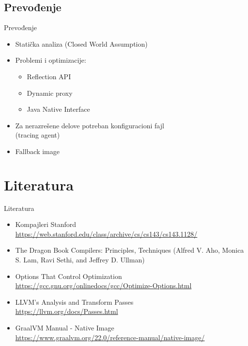 \documentclass[compress, containsverbatim,mathserif, xcolor=dvipsnames, unicode]{beamer}
\begin{document}
\subsection{Prevođenje}
\begin{frame}{Prevođenje}
    \begin{itemize}
        \item Statička analiza (Closed World Assumption)
        \vspace{1em}
        \item Problemi i optimizacije:
        \begin{itemize}
            \item Reflection API
            \item Dynamic proxy
            \item Java Native Interface
        \end{itemize}        
        \vspace{1em}
        \item Za nerazrešene delove potreban konfiguracioni fajl \\ (tracing agent)
        \item Fallback image
    \end{itemize}
\end{frame}

\section{Literatura}
\begin{frame}{Literatura}
    \begin{itemize}
        \item Kompajleri Stanford \\ \scriptsize \url{https://web.stanford.edu/class/archive/cs/cs143/cs143.1128/}  \normalsize
        \item The Dragon Book Compilers: Principles, Techniques (Alfred V. Aho, Monica S. Lam, Ravi Sethi, and Jeffrey D. Ullman) \normalsize
        \item Options That Control Optimization \\ \scriptsize \url{https://gcc.gnu.org/onlinedocs/gcc/Optimize-Options.html} \normalsize
        \item LLVM's Analysis and Transform Passes \\ \scriptsize \url{https://llvm.org/docs/Passes.html} \normalsize
        \item GraalVM Manual - Native Image \\ \scriptsize \url{https://www.graalvm.org/22.0/reference-manual/native-image/} \normalsize
    \end{itemize}
\end{frame}
\end{document}
